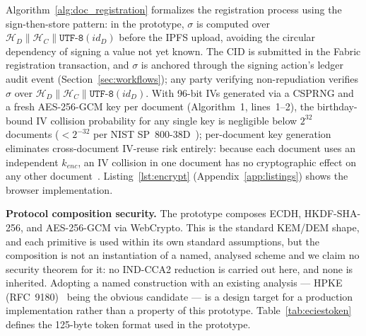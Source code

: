 \documentclass[preprint,12pt]{elsarticle}
\begin{document}
Algorithm~\ref{alg:doc_registration} formalizes the registration
process using the sign-then-store pattern: in the prototype, $\sigma$ is
computed over $\mathcal{H}_D \| \mathcal{H}_C \| \texttt{UTF-8}(id_D)$
before the IPFS upload, avoiding the circular dependency of signing a
value not yet known. The CID is submitted in the Fabric registration
transaction, and $\sigma$ is anchored through the signing action's
ledger audit event (Section~\ref{sec:workflows}); any party verifying
non-repudiation verifies $\sigma$ over
$\mathcal{H}_D \| \mathcal{H}_C \| \texttt{UTF-8}(id_D)$. With 96-bit IVs generated via a
CSPRNG and a fresh AES-256-GCM key per document (Algorithm~1,
lines~1--2), the birthday-bound IV collision probability for any
single key is negligible below $2^{32}$ documents
($<2^{-32}$ per NIST SP~800-38D~\cite{nist80038d}); per-document
key generation eliminates cross-document IV-reuse risk entirely: because
each document uses an independent $k_{enc}$, an IV collision in one
document has no cryptographic effect on any other document~\cite{nist80038d}.
Listing~\ref{lst:encrypt} (Appendix~\ref{app:listings}) shows the browser implementation.

\textbf{Protocol composition security.} The prototype composes
\mbox{ECDH}, \mbox{HKDF-SHA-256}, and \mbox{AES-256-GCM} via WebCrypto. This
is the standard KEM/DEM shape, and each primitive is used within its own
standard assumptions, but the composition is not an instantiation of a named,
analysed scheme and we claim no security theorem for it: no
\textsc{IND-CCA2} reduction is carried out here, and none is inherited.
Adopting a named construction with an existing analysis --- \textsc{HPKE}
(RFC~9180)~\cite{rfc9180} being the obvious candidate --- is a design target for a
production implementation rather than a property of this prototype.
Table~\ref{tab:eciestoken} defines the 125-byte token format used in the
prototype.
\end{document}

